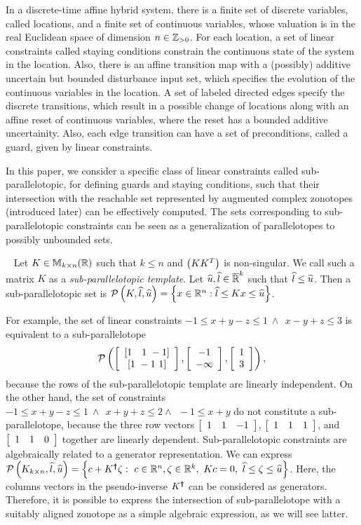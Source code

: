 
In a discrete-time affine hybrid system, there is a finite set of
discrete variables, called locations, and a finite set of continuous
variables, whose valuation is in the real Euclidean space of dimension
$n\in\mathbb{Z}_{> 0}$.  For each location, a set of linear constraints called
staying conditions constrain the continuous state of the system in the
location.  Also, there is an affine transition map with a (possibly)
additive uncertain but bounded disturbance input set, which specifies
the evolution of the continuous variables in the location.  A set of
labeled directed edges specify the discrete transitions, which result
in a possible change of locations along with an affine reset of
continuous variables, where the reset has a bounded additive
uncertainity.  Also, each edge transition can have a set of
preconditions, called a guard, given by linear constraints.

In this paper, we consider a specific class of linear constraints
called sub-parallelotopic, for defining guards and staying
conditions, such that their intersection with the reachable set
represented by augmented complex zonotopes (introduced later) can be
effectively computed. The sets corresponding to sub-parallelotopic
constraints can be seen as a generalization of parallelotopes to
possibly unbounded sets. %
%
\begin{definition}~\label{defn:sub-parallelotope} Let
  $K\in\mathbb{M}_{k\times n}(\mathbb{R})$ such that $k\leq n$ and $\left(KK^T\right)$ is
  non-singular.  We call such a matrix $K$ as a
  \emph{sub-parallelotopic template}.  Let
  $\widehat{u},\widehat{l}\in\mathbb{\overline{R}}^k$ such that $\widehat{l}\leq\widehat{u}$.  Then
  a sub-parallelotopic set is $\mathcal{P}\left(K,\widehat{l},\widehat{u}\right) = \left\{x\in\mathbb{R}^n: \widehat{l}\leq Kx \leq \widehat{u}\right\}$.
\end{definition}
%
For example, the set of linear constraints $-1\leq x+y-z\leq
1~\wedge~~ x-y+z\leq 3$ is equivalent to a sub-parallelotope
$$\mathcal{P}\left(\left[\begin{array}{c}{\left[1~~~1~-1\right]}\\{\left[1~-1~1\right]} \end{array}\right],\left[\begin{array}{c}{-1}\\{-\infty} \end{array}\right],\left[\begin{array}{c}{1}\\{3} \end{array}\right]\right),$$
because the rows of the sub-parallelotopic template are linearly
independent.  On the other hand, the set of constraints $-1\leq
x+y-z\leq 1~\wedge~~x+y+z\leq 2\wedge~~-1\leq x+y$ do not constitute a
sub-parallelotope, because the three row vectors $\left[\begin{array}{c
c c}1 & 1 & -1\end{array}\right]$, $\left[\begin{array}{c c c}1 & 1 &
1\end{array}\right]$, and $\left[\begin{array}{c c c}1 & 1 &
0\end{array}\right]$ together are linearly dependent.  Sub-parallelotopic
constraints are algebraically related to a generator representation.
We can express $\mathcal{P}\left(K_{k\times
n},\widehat{l},\widehat{u}\right)=\left\{c+K^{\bm{\dagger}}\zeta:~c\in\mathbb{R}^n,\zeta\in\mathbb{R}^k,~Kc=0,~\widehat{l}\leq \zeta\leq \widehat{u}\right\}$.
Here, the columns vectors in the pseudo-inverse $K^{\bm{\dagger}}$ can be
considered as generators.  Therefore, it is possible to express the
intersection of sub-parallelotope with a suitably aligned zonotope as
a simple algebraic expression, as we will see latter.

